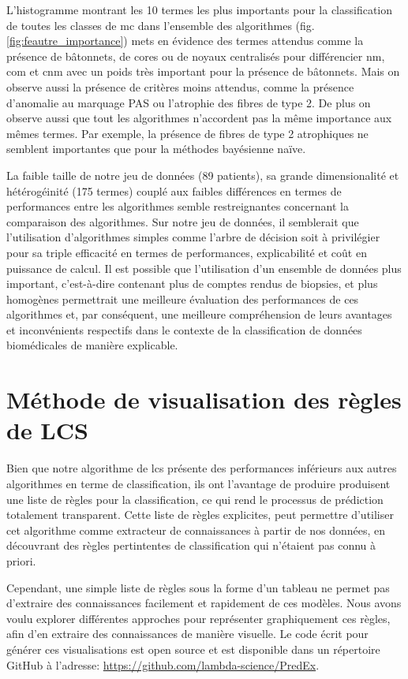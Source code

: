 L'histogramme montrant les 10 termes les plus importants pour la classification de toutes les classes de \gls{mc} dans l'ensemble des algorithmes (fig. \ref{fig:feautre_importance}) mets en évidence des termes attendus comme la présence de bâtonnets, de cores ou de noyaux centralisés pour différencier \gls{nm}, \gls{com} et \gls{cnm} avec un poids très important pour la présence de bâtonnets. Mais on observe aussi la présence de critères moins attendus, comme la présence d'anomalie au marquage PAS ou l'atrophie des fibres de type 2. De plus on observe aussi que tout les algorithmes n'accordent pas la même importance aux mêmes termes. Par exemple, la présence de fibres de type 2 atrophiques ne semblent importantes que pour la méthodes bayésienne naïve.

La faible taille de notre jeu de données (89 patients), sa grande dimensionalité et hétérogéinité (175 termes) couplé aux faibles différences en termes de performances entre les algorithmes semble restreignantes concernant la comparaison des algorithmes. Sur notre jeu de données, il semblerait que l'utilisation d'algorithmes simples comme l'arbre de décision soit à privilégier pour sa triple efficacité en termes de performances, explicabilité et coût en puissance de calcul. Il est possible que l'utilisation d'un ensemble de données plus important, c’est-à-dire contenant plus de comptes rendus de biopsies, et plus homogènes permettrait une meilleure évaluation des performances de ces algorithmes et, par conséquent, une meilleure compréhension de leurs avantages et inconvénients respectifs dans le contexte de la classification de données biomédicales de manière explicable.

\section{Méthode de visualisation des règles de LCS}\label{lcs_viz_sec}
Bien que notre algorithme de \gls{lcs} présente des performances inférieurs aux autres algorithmes en terme de classification, ils ont l'avantage de produire produisent une liste de règles pour la classification, ce qui rend le processus de prédiction totalement transparent. Cette liste de règles explicites, peut permettre d'utiliser cet algorithme comme extracteur de connaissances à partir de nos données, en découvrant des règles pertintentes de classification qui n'étaient pas connu à priori.

Cependant, une simple liste de règles sous la forme d'un tableau ne permet pas d'extraire des connaissances facilement et rapidement de ces modèles. Nous avons voulu explorer différentes approches pour représenter graphiquement ces règles, afin d'en extraire des connaissances de manière visuelle. Le code écrit pour générer ces visualisations est open source et est disponible dans un répertoire GitHub à l'adresse: \url{https://github.com/lambda-science/PredEx}.

